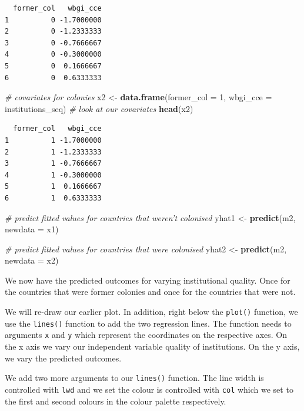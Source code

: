 \documentclass[]{article}
\newenvironment{Shaded}{\begin{snugshade}}{\end{snugshade}}
\newcommand{\KeywordTok}[1]{\textcolor[rgb]{0.13,0.29,0.53}{\textbf{#1}}}
\newcommand{\DataTypeTok}[1]{\textcolor[rgb]{0.13,0.29,0.53}{#1}}
\newcommand{\DecValTok}[1]{\textcolor[rgb]{0.00,0.00,0.81}{#1}}
\newcommand{\StringTok}[1]{\textcolor[rgb]{0.31,0.60,0.02}{#1}}
\newcommand{\CommentTok}[1]{\textcolor[rgb]{0.56,0.35,0.01}{\textit{#1}}}
\newcommand{\NormalTok}[1]{#1}
\theoremstyle{definition}
\theoremstyle{definition}
\theoremstyle{definition}
\theoremstyle{remark}
\begin{document}
\begin{verbatim}
  former_col   wbgi_cce
1          0 -1.7000000
2          0 -1.2333333
3          0 -0.7666667
4          0 -0.3000000
5          0  0.1666667
6          0  0.6333333
\end{verbatim}

\begin{Shaded}
\begin{Highlighting}[]
\CommentTok{# covariates for colonies}
\NormalTok{x2 <-}\StringTok{ }\KeywordTok{data.frame}\NormalTok{(}\DataTypeTok{former_col =} \DecValTok{1}\NormalTok{, }\DataTypeTok{wbgi_cce =}\NormalTok{ institutions_seq)}
\CommentTok{# look at our covariates}
\KeywordTok{head}\NormalTok{(x2)}
\end{Highlighting}
\end{Shaded}

\begin{verbatim}
  former_col   wbgi_cce
1          1 -1.7000000
2          1 -1.2333333
3          1 -0.7666667
4          1 -0.3000000
5          1  0.1666667
6          1  0.6333333
\end{verbatim}

\begin{Shaded}
\begin{Highlighting}[]
\CommentTok{# predict fitted values for countries that weren't colonised }
\NormalTok{yhat1 <-}\StringTok{ }\KeywordTok{predict}\NormalTok{(m2, }\DataTypeTok{newdata =}\NormalTok{ x1)}

\CommentTok{# predict fitted values for countries that were colonised}
\NormalTok{yhat2 <-}\StringTok{ }\KeywordTok{predict}\NormalTok{(m2, }\DataTypeTok{newdata =}\NormalTok{ x2)}
\end{Highlighting}
\end{Shaded}

We now have the predicted outcomes for varying institutional quality.
Once for the countries that were former colonies and once for the
countries that were not.

We will re-draw our earlier plot. In addition, right below the
\texttt{plot()} function, we use the \texttt{lines()} function to add
the two regression lines. The function needs to arguments \texttt{x} and
\texttt{y} which represent the coordinates on the respective axes. On
the x axis we vary our independent variable quality of institutions. On
the y axis, we vary the predicted outcomes.

We add two more arguments to our \texttt{lines()} function. The line
width is controlled with \texttt{lwd} and we set the colour is
controlled with \texttt{col} which we set to the first and second
colours in the colour palette respectively.
\end{document}
